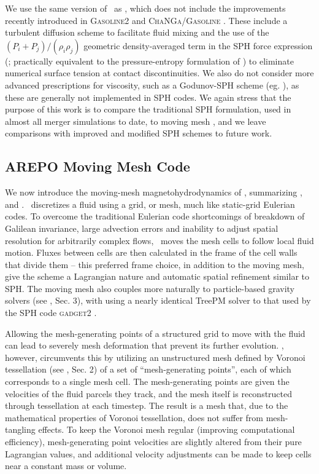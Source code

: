 We use the same version of \gasoline\ as \citeal{zhu+13}, which does not include the improvements recently introduced in \textsc{Gasoline2} \citep{kell+15, tamb+15} and \textsc{ChaNGa/Gasoline} \citep{gove+15}.  These include a turbulent diffusion scheme to facilitate fluid mixing \citep{shen+10} and the use of the $(P_i + P_j)/(\rho_i\rho_j)$ geometric density-averaged term in the SPH force expression (\citealt{kell+14}; practically equivalent to the pressure-entropy formulation of \cite{hopk13}) to eliminate numerical surface tension at contact discontinuities.  We also do not consider more advanced prescriptions for viscosity, such as a Godunov-SPH scheme (eg. \citealt{chaw16}), as these are generally not implemented in SPH codes.  We again stress that the purpose of this work is to compare the traditional SPH formulation, used in almost all merger simulations to date, to moving mesh \arepo, and we leave comparisons with improved and modified SPH schemes to future work.

\subsection{AREPO Moving Mesh Code}
\label{ssec:c3_arepo}

We now introduce the moving-mesh magnetohydrodynamics of \arepo, summarizing \cite{spri10}, \cite{pakmbs11} and \cite{pakms13}.  \arepo\ discretizes a fluid using a grid, or mesh, much like static-grid Eulerian codes.  To overcome the traditional Eulerian code shortcomings of breakdown of Galilean invariance, large advection errors and inability to adjust spatial resolution for arbitrarily complex flows, \arepo\ moves the mesh cells to follow local fluid motion.  Fluxes between cells are then calculated in the frame of the cell walls that divide them -- this preferred frame choice, in addition to the moving mesh, give the scheme a Lagrangian nature and automatic spatial refinement similar to SPH.  The moving mesh also couples more naturally to particle-based gravity solvers (see \citealt{spri10}, Sec. 3), with \arepo using a nearly identical TreePM solver to that used by the SPH code \textsc{gadget2} \citep{spri05}.

Allowing the mesh-generating points of a structured grid to move with the fluid can lead to severely mesh deformation that prevent its further evolution.  \arepo, however, circumvents this by utilizing an unstructured mesh defined by Voronoi tessellation (see \citealt{spri10}, Sec. 2) of a set of ``mesh-generating points'', each of which corresponds to a single mesh cell.  The mesh-generating points are given the velocities of the fluid parcels they track, and the mesh itself is reconstructed through tessellation at each timestep.  The result is a mesh that, due to the mathematical properties of Voronoi tessellation, does not suffer from mesh-tangling effects.  To keep the Voronoi mesh regular (improving computational efficiency), mesh-generating point velocities are slightly altered from their pure Lagrangian values, and additional velocity adjustments can be made to keep cells near a constant mass or volume.

